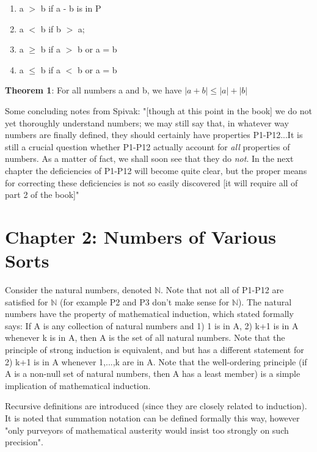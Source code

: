 \documentclass{article}
\begin{document}
\begin{enumerate}
	\item a $>$ b if a - b is in P
	\item a $<$ b if b $>$ a;
	\item a $\geq$ b if a $>$ b or a = b
	\item a $\leq$ b if a $<$ b or a = b
\end{enumerate}

\textbf{Theorem 1}: For all numbers a and b, we have $ |a+b| \leq |a|+|b| $

\begin{flushleft}
Some concluding notes from Spivak: "[though at this point in the book] we do not yet thoroughly understand numbers; we may still say that, in whatever way numbers are finally defined, they should certainly have properties P1-P12...It is still a crucial question whether P1-P12 actually account for \textit{all} properties of numbers. As a matter of fact, we shall soon see that they do \textit{not}. In the next chapter the deficiencies of P1-P12 will become quite clear, but the proper means for correcting these deficiencies is not so easily discovered [it will require all of part 2 of the book]"
\end{flushleft}

\section{Chapter 2: Numbers of Various Sorts}

\begin{flushleft}
Consider the natural numbers, denoted $\mathbb{N}$. Note that not all of P1-P12 are satisfied for $\mathbb{N}$ (for example P2 and P3 don't make sense for $\mathbb{N}$). The natural numbers have the property of mathematical induction, which stated formally says: If A is any collection of natural numbers and 1) 1 is in A, 2) k+1 is in A whenever k is in A, then A is the set of all natural numbers. Note that the principle of strong induction is equivalent, and but has a different statement for 2) k+1 is in A whenever 1,...,k are in A. Note that the well-ordering principle (if A is a non-null set of natural numbers, then A has a least member) is a simple implication of mathematical induction.
\end{flushleft}

\begin{flushleft}
Recursive definitions are introduced (since they are closely related to induction). It is noted that summation notation can be defined formally this way, however "only purveyors of mathematical austerity would insist too strongly on such precision".
\end{flushleft}
\end{document}
